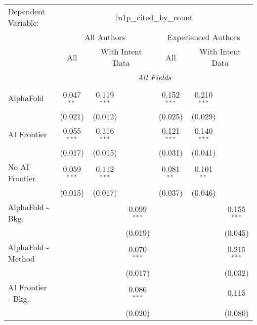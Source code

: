 \begingroup
\centering
\begin{tabular}{lcccccc}
   \tabularnewline \midrule \midrule
   Dependent Variable: & \multicolumn{6}{c}{ln1p\_cited\_by\_count}\\
 & \multicolumn{3}{c}{All Authors} & \multicolumn{3}{c}{Experienced Authors} \\
\cmidrule(lr){2-4} \cmidrule(lr){5-7}
 & \multicolumn{1}{c}{All} & \multicolumn{2}{c}{With Intent Data} & \multicolumn{1}{c}{All} & \multicolumn{2}{c}{With Intent Data} \\
\cmidrule(lr){2-2} \cmidrule(lr){3-4} \cmidrule(lr){5-5} \cmidrule(lr){6-7}
 & \multicolumn{6}{c}{\textit{All Fields}} \\ \\
   AlphaFold               & 0.047$^{**}$  & 0.119$^{***}$ &               & 0.152$^{***}$ & 0.210$^{***}$ &   \\   
                           & (0.021)       & (0.012)       &               & (0.025)       & (0.029)       &   \\   
   AI Frontier             & 0.055$^{***}$ & 0.116$^{***}$ &               & 0.121$^{***}$ & 0.140$^{***}$ &   \\   
                           & (0.017)       & (0.015)       &               & (0.031)       & (0.041)       &   \\   
   No AI Frontier          & 0.059$^{***}$ & 0.112$^{***}$ &               & 0.081$^{**}$  & 0.101$^{**}$  &   \\   
                           & (0.015)       & (0.017)       &               & (0.037)       & (0.046)       &   \\   
   AlphaFold - Bkg.        &               &               & 0.099$^{***}$ &               &               & 0.155$^{***}$\\   
                           &               &               & (0.019)       &               &               & (0.045)\\   
   AlphaFold - Method      &               &               & 0.070$^{***}$ &               &               & 0.215$^{***}$\\   
                           &               &               & (0.017)       &               &               & (0.032)\\   
   AI Frontier - Bkg.      &               &               & 0.086$^{***}$ &               &               & 0.115\\   
                           &               &               & (0.020)       &               &               & (0.080)\\   

\end{tabular}
